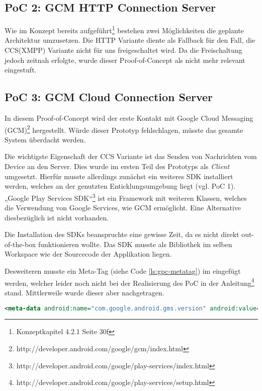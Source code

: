 \subsection{PoC 2: GCM HTTP Connection Server}

Wie im Konzept bereits aufgeführt\footnote{Konzeptkapitel 4.2.1 Seite 30f} bestehen zwei Möglichkeiten die geplante Architektur umzusetzen. Die HTTP Variante diente als Fallback für den Fall, die CCS(XMPP) Variante nicht für uns freigeschaltet wird. Da die Freischaltung jedoch zeitnah erfolgte, wurde dieser Proof-of-Concept als nicht mehr relevant eingestuft.

\subsection{PoC 3: GCM Cloud Connection Server}

In diesem Proof-of-Concept wird der erste Kontakt mit Google Cloud Messaging (GCM)\footnote{http://developer.android.com/google/gcm/index.html} hergestellt. Würde dieser Prototyp fehlschlagen, müsste das gesamte System überdacht werden.

Die wichtigste Eigenschaft der CCS Variante ist das Senden von Nachrichten vom Device an den Server. Dies wurde im ersten Teil des Prototyps als \textit{Client} umgesetzt. Hierfür musste allerdings zunächst ein weiteres SDK installiert werden, welches an der genutzten Enticklungsumgebung liegt (vgl. PoC 1). „Google Play Services SDK“\footnote{http://developer.android.com/google/play-services/index.html} ist ein Framework mit weiteren Klassen, welches die Verwendung von Google Services, wie GCM ermöglicht. Eine Alternative diesbezüglich ist nicht vorhanden.

Die Installation des SDKs beanspruchte eine gewisse Zeit, da es nicht direkt out-of-the-box funktionieren wollte. Das SDK musste als Bibliothek im selben Workspace wie der Sourcecode der Applikation liegen.

Desweiteren musste ein Meta-Tag (siehe Code \ref{ls:gpc-metatag}) im eingefügt werden, welcher leider noch nicht bei der Realisierung des PoC in der Anleitung\footnote{http://developer.android.com/google/play-services/setup.html} stand. Mittlerweile wurde dieser aber nachgetragen.

\begin{lstlisting}[label=ls:gpc-metatag,caption=Meta-Tag für Google Play Services in AndroidManifest.xml,language=XML]
<meta-data android:name="com.google.android.gms.version" android:value="@integer/google_play_services_version" />
\end{lstlisting}

